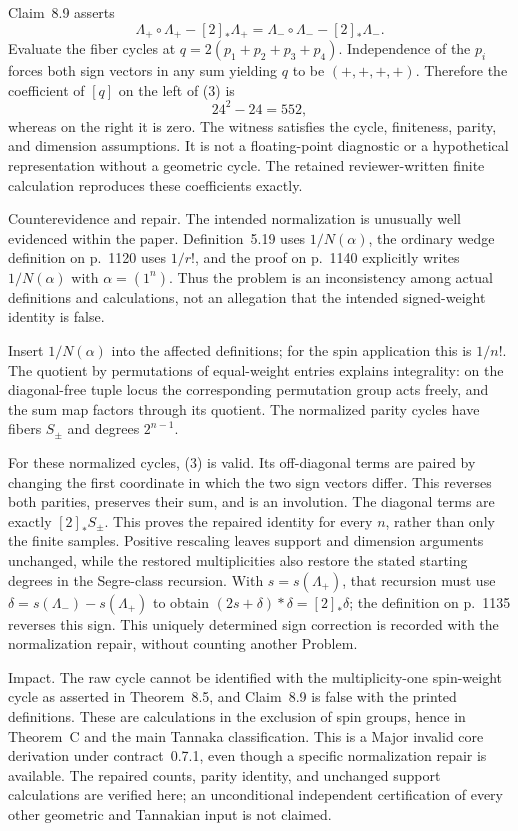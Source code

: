 \documentclass[10pt]{article}
\begin{document}
Claim 8.9 asserts \[\Lambda_+\circ\Lambda_+-[2]_*\Lambda_+
 =
 \Lambda_-\circ\Lambda_--[2]_*\Lambda_-.
 \tag{3}\] Evaluate the fiber cycles at \(q=2(p_1+p_2+p_3+p_4)\). Independence of the \(p_i\) forces both sign vectors in any sum yielding \(q\) to be \((+,+,+,+)\). Therefore the coefficient of \([q]\) on the left of (3) is \[24^2-24=552,\] whereas on the right it is zero. The witness satisfies the cycle, finiteness, parity, and dimension assumptions. It is not a floating-point diagnostic or a hypothetical representation without a geometric cycle. The retained reviewer-written finite calculation reproduces these coefficients exactly.\par
Counterevidence and repair. The intended normalization is unusually well evidenced within the paper. Definition 5.19 uses \(1/N(\alpha)\), the ordinary wedge definition on p. 1120 uses \(1/r!\), and the proof on p. 1140 explicitly writes \(1/N(\alpha)\) with \(\alpha=(1^n)\). Thus the problem is an inconsistency among actual definitions and calculations, not an allegation that the intended signed-weight identity is false.\par
Insert \(1/N(\alpha)\) into the affected definitions; for the spin application this is \(1/n!\). The quotient by permutations of equal-weight entries explains integrality: on the diagonal-free tuple locus the corresponding permutation group acts freely, and the sum map factors through its quotient. The normalized parity cycles have fibers \(S_\pm\) and degrees \(2^{n-1}\).\par
For these normalized cycles, (3) is valid. Its off-diagonal terms are paired by changing the first coordinate in which the two sign vectors differ. This reverses both parities, preserves their sum, and is an involution. The diagonal terms are exactly \([2]_*S_\pm\). This proves the repaired identity for every \(n\), rather than only the finite samples. Positive rescaling leaves support and dimension arguments unchanged, while the restored multiplicities also restore the stated starting degrees in the Segre-class recursion. With \(s=s(\Lambda_+)\), that recursion must use \(\delta=s(\Lambda_-)-s(\Lambda_+)\) to obtain \((2s+\delta)*\delta=[2]_*\delta\); the definition on p. 1135 reverses this sign. This uniquely determined sign correction is recorded with the normalization repair, without counting another Problem.\par
Impact. The raw cycle cannot be identified with the multiplicity-one spin-weight cycle as asserted in Theorem 8.5, and Claim 8.9 is false with the printed definitions. These are calculations in the exclusion of spin groups, hence in Theorem C and the main Tannaka classification. This is a Major invalid core derivation under contract 0.7.1, even though a specific normalization repair is available. The repaired counts, parity identity, and unchanged support calculations are verified here; an unconditional independent certification of every other geometric and Tannakian input is not claimed.\par
\end{document}

